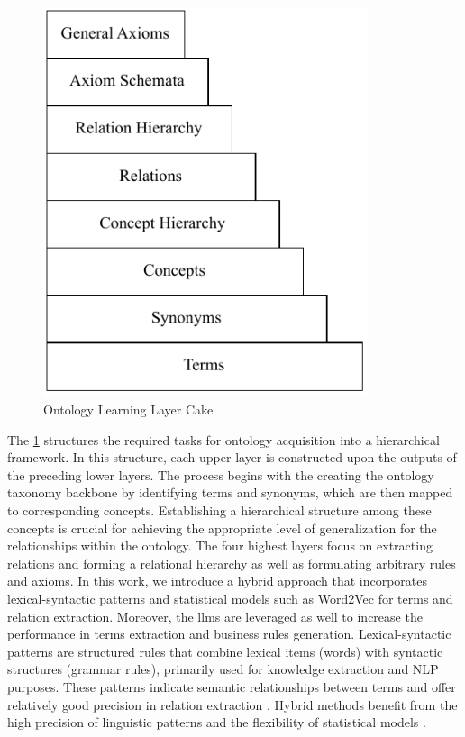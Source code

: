 \begin{figure}[hbt]
\hypertarget{fig:onto-ol-cake}{%
\centering
\includegraphics[width=0.85\textwidth]{../figures/MyFigures/OLLayerCake.drawio.pdf}
\captionsetup{justification=centering}
\caption{Ontology Learning Layer Cake \autocite{Wroblewska2012}}\label{fig:onto-ol-cake}
}
\end{figure}
The \cref{fig:onto-ol-cake} structures the required tasks for ontology acquisition into a hierarchical framework. In this structure, each upper layer is constructed upon the outputs of the preceding lower layers. The process begins with the creating the ontology taxonomy backbone by identifying terms and synonyms, which are then mapped to corresponding concepts. Establishing a hierarchical structure among these concepts is crucial for achieving the appropriate level of generalization for the relationships within the ontology. The four highest layers focus on extracting relations and forming a relational hierarchy as well as formulating arbitrary rules and axioms. 
In this work, we introduce a hybrid approach that incorporates lexical-syntactic patterns and statistical models such as Word2Vec for terms and relation extraction. Moreover, the  \gls{llm}s are leveraged as well to increase the performance in terms extraction and business rules generation. 
Lexical-syntactic patterns are structured rules that combine lexical items (words) with syntactic structures (grammar rules), primarily used for knowledge extraction and NLP purposes. These patterns indicate semantic relationships between terms and offer relatively good precision in relation extraction \autocite{Watrobski2020}. Hybrid methods benefit from the high precision of linguistic patterns and the flexibility of statistical models \autocite{Mellal2021}. 

